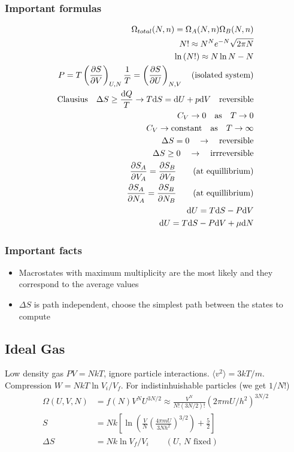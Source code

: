 \documentclass[a4paper, norsk, 8pt]{article}
\begin{document}
\begin{multicols*}{3}
\subsubsection*{\scriptsize Important formulas}
\begin{align*}
  \Omega_{total}(N, n) = \Omega_A(N, n)\Omega_B(N, n)\\
  N! \approx N^Ne^{-N}\sqrt{2\pi N} \\
  \ln{(N!)} \approx N\ln{N}-N \\
  P = T \left( \pdv{S}{V} \right)_{U, N}
  \frac{1}{T} = \left( \pdv{S}{U} \right)_{N, V} \quad (\text{isolated system}) \\
  \text{Clausius} \quad \Delta S \geq \frac{\mbox{d} Q}{T} \rightarrow T\mbox{d} S = \mbox{d}U + p\mbox{d}V \quad \text{reversible}\\
  C_V \rightarrow 0 \quad \text{as} \quad T \rightarrow 0 \\
  C_V \rightarrow \text{constant} \quad \text{as} \quad T \rightarrow \infty \\
  \Delta S = 0 \quad \rightarrow \quad \text{reversible} \\
  \Delta S \geq 0 \quad \rightarrow \quad \text{irrreversible} \\
  \pdv{S_A}{V_A} = \pdv{S_B}{V_B} \qquad (\text{at equillibrium}) \\
  \pdv{S_A}{N_A} = \pdv{S_B}{N_B} \qquad (\text{at equillibrium}) \\
  \mbox{d}U = T\mbox{d}S - P\mbox{d}V \\
  \mbox{d}U = T\mbox{d}S - P\mbox{d}V  + \mu \mbox{d}N\\
\end{align*}

\subsubsection*{\scriptsize Important facts}
\begin{itemize}
  \item Macrostates with maximum multiplicity are the most likely and they correspond to the average values
  \item $\Delta S$ is path independent, choose the simplest path between the states to compute
\end{itemize}

\subsection*{\footnotesize  Ideal Gas}
Low density gas $PV=NkT$, ignore particle interactions. $\langle v^2 \rangle = 3kT/m$. Compression $W =NkT\ln{V_i/V_f}$.
For indistinhuishable particles (we get $1/N!$)
\begin{align*}
  \Omega(U, V, N) &= f(N)V^NU^{3N/2} \approx \frac{V^N}{N!(3N/2)!}(2\pi mU/h^2)^{3N/2} \\
  S &= Nk\left[\ln\left( \frac{V}{N}\left( \frac{4\pi m U}{3Nh^2} \right)^{3/2}  \right) + \frac{5}{2}\right] \\
  \Delta S &= Nk\ln{V_f/V_i} \qquad (\text{$U$, $N$ fixed})
\end{align*}



\end{multicols*}
\end{document}
